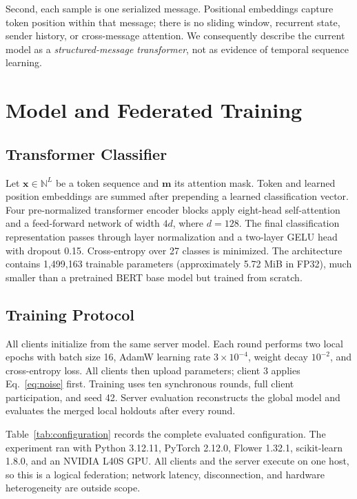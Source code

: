 \documentclass[journal]{IEEEtran}
\begin{document}
Second, each sample is one serialized message. Positional embeddings capture token position within that message; there is no sliding window, recurrent state, sender history, or cross-message attention. We consequently describe the current model as a \emph{structured-message transformer}, not as evidence of temporal sequence learning.

\section{Model and Federated Training}

\subsection{Transformer Classifier}
Let $\mathbf{x}\in\mathbb{N}^{L}$ be a token sequence and $\mathbf{m}$ its attention mask. Token and learned position embeddings are summed after prepending a learned classification vector. Four pre-normalized transformer encoder blocks apply eight-head self-attention and a feed-forward network of width $4d$, where $d=128$. The final classification representation passes through layer normalization and a two-layer GELU head with dropout 0.15. Cross-entropy over 27 classes is minimized. The architecture contains 1,499,163 trainable parameters (approximately 5.72 MiB in FP32), much smaller than a pretrained BERT base model but trained from scratch.

\subsection{Training Protocol}
All clients initialize from the same server model. Each round performs two local epochs with batch size 16, AdamW learning rate $3\times10^{-4}$, weight decay $10^{-2}$, and cross-entropy loss. All clients then upload parameters; client 3 applies Eq.~\eqref{eq:noise} first. Training uses ten synchronous rounds, full client participation, and seed 42. Server evaluation reconstructs the global model and evaluates the merged local holdouts after every round.

Table~\ref{tab:configuration} records the complete evaluated configuration. The experiment ran with Python 3.12.11, PyTorch 2.12.0, Flower 1.32.1, scikit-learn 1.8.0, and an NVIDIA L40S GPU. All clients and the server execute on one host, so this is a logical federation; network latency, disconnection, and hardware heterogeneity are outside scope.
\end{document}
